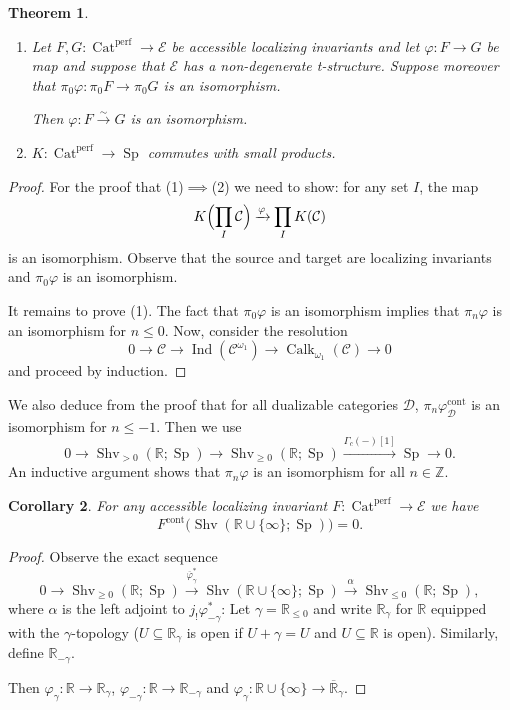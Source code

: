 \documentclass[draft]{amsart}
\newcommand{\ZZ}{\mathbb{Z}}
\newcommand{\RR}{\mathbb{R}}
\newcommand{\ol}[1]{\overline{#1}}
\newcommand{\cat}[1]{\mathcal{#1}}
\newcommand{\xto}[1]{\mathbin{\xrightarrow{#1}}}
\newcommand{\isoto}{\mathbin{\xrightarrow{\sim}}}
\newcommand{\blank}{-} %
\DeclareMathOperator{\Ind}{Ind}
\DeclareMathOperator{\Shv}{Shv}
\DeclareMathOperator{\Cat}{Cat}
\DeclareMathOperator{\Sp}{Sp}
\DeclareMathOperator{\Calk}{Calk}
\newtheorem{thm}{Theorem}[section]
\newtheorem{cor}[thm]{Corollary}
\theoremstyle{definition}
\begin{document}
\begin{thm}
\begin{enumerate}[(1)]
\item Let $F,G\colon \Cat^{\mathrm{perf}} \to \cat E$ be accessible localizing invariants and let $\varphi\colon F\to G$ be map and suppose that $\cat E$ has a non-degenerate t-structure. Suppose moreover that $\pi_0\varphi\colon \pi_0F \to \pi_0G$ is an isomorphism.

Then $\varphi\colon F\isoto G$ is an isomorphism.

\item $K\colon \Cat^{\mathrm{perf}} \to \Sp$ commutes with small products.
\end{enumerate}
\end{thm}
\begin{proof}
For the proof that (1)$\implies$(2) we need to show: for any set $I$, the map
\[
K\Bigl(\prod_I \cat C\Bigr) \xto{\varphi} \prod_IK(\cat C)
\]
is an isomorphism. Observe that the source and target are localizing invariants and $\pi_0\varphi$ is an isomorphism.

It remains to prove (1). The fact that $\pi_0\varphi$ is an isomorphism implies that $\pi_n\varphi$ is an isomorphism for $n\le 0$. Now, consider the resolution
\[
0\to \cat C \to \Ind(\cat C^{\omega_1}) \to \Calk_{\omega_1}(\cat C) \to 0
\]
and proceed by induction.
\end{proof}

We also deduce from the proof that for all dualizable categories $\cat D$, $\pi_n\varphi^{\mathrm{cont}}_{\cat D}$ is an isomorphism for $n\le -1$. Then we use
\[
0\to \Shv_{>0}(\RR;\Sp) \to \Shv_{\ge0}(\RR;\Sp) \xrightarrow{\Gamma_c(\blank)[1]} \Sp \to 0.
\]
An inductive argument shows that $\pi_n\varphi$ is an isomorphism for all $n\in\ZZ$.

\begin{cor}
For any accessible localizing invariant $F\colon \Cat^{\mathrm{perf}} \to \cat E$ we have
\[
F^{\mathrm{cont}}\bigl(\Shv(\RR\cup\{\infty\}; \Sp)\bigr) = 0.
\]
\end{cor}
\begin{proof}
Observe the exact sequence
\[
0\to \Shv_{\ge0}(\RR;\Sp) \xto{\ol\varphi_\gamma^*} \Shv(\RR\cup \{\infty\}; \Sp) \xto{\alpha} \Shv_{\le 0}(\RR; \Sp),
\]
where $\alpha$ is the left adjoint to $j_!\varphi_{-\gamma}^*$: Let $\gamma = \RR_{\le 0}$ and write $\RR_{\gamma}$ for $\RR$ equipped with the $\gamma$-topology ($U \subseteq \RR_\gamma$ is open if $U + \gamma = U$ and $U\subseteq \RR$ is open). Similarly, define $\RR_{-\gamma}$.

Then $\varphi_\gamma \colon \RR\to \RR_{\gamma}$, $\varphi_{-\gamma} \colon \RR \to \RR_{-\gamma}$ and $\varphi_\gamma\colon \RR\cup\{\infty\} \to \ol{\RR}_\gamma$.
\end{proof}
\end{document}
